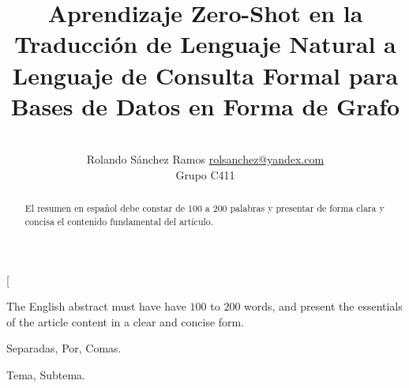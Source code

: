 \documentclass[a4paper,10pt,twocolumn]{article}
\title{Aprendizaje Zero-Shot en la Traducción de Lenguaje Natural a Lenguaje de Consulta Formal para Bases de Datos en Forma de Grafo}
\author{\\
\name Rolando S\'anchez Ramos \email \href{mailto:rolsanchez@yandex.com}{rolsanchez@yandex.com}
	\\ \addr Grupo C411}
\begin{document}
\twocolumn[

\maketitle


\begin{abstract}

	El resumen en español debe constar de $100$ a $200$ palabras y presentar de forma
	clara y concisa el contenido fundamental del artículo.

\end{abstract}

\vspace{0.5cm}

\begin{enabstract}

  The English abstract must have have $100$ to $200$ words, and present 
  the essentials of the article content in a clear and concise form.

\end{enabstract}

\begin{keywords}
	Separadas,
	Por,
	Comas.
\end{keywords}

\begin{topics}
	Tema, Subtema.
\end{topics}
\end{document}
